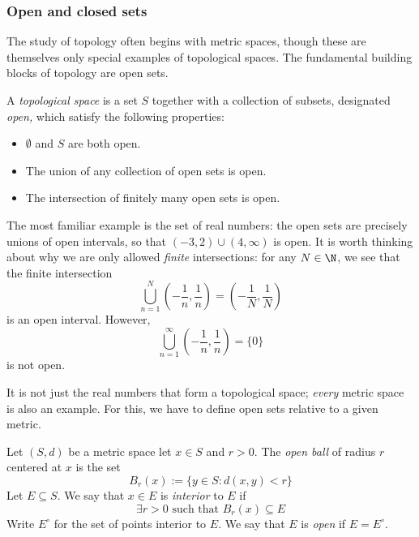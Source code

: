 \subsubsection*{Open and closed sets}

The study of topology often begins with metric spaces, though these are themselves only special examples of topological spaces. The fundamental building blocks of topology are open sets.

\begin{defn}
A \emph{topological space} is a set $S$ together with a collection of subsets, designated \emph{open,} which satisfy the following properties:
\begin{itemize}
  \item $\emptyset$ and $S$ are both open.
  \item The union of any collection of open sets is open.
  \item The intersection of finitely many open sets is open.
\end{itemize}
\end{defn}

The most familiar example is the set of real numbers: the open sets are precisely unions of open intervals, so that $(-3,2)\cup(4,\infty)$ is open. It is worth thinking about why we are only allowed \emph{finite} intersections: for any $N\in\N$, we see that the finite intersection
\[\bigcup_{n=1}^N\left(-\frac 1n,\frac 1n\right)=\left(-\frac 1N,\frac 1N\right)\]
is an open interval. However,
\[\bigcup_{n=1}^\infty\left(-\frac 1n,\frac 1n\right)=\{0\}\]
is not open.\pagebreak[1]

It is not just the real numbers that form a topological space; \emph{every} metric space is also an example. For this, we have to define open sets relative to a given metric.

\begin{defn}
Let $(S,d)$ be a metric space let $x\in S$ and $r>0$. The \emph{open ball} of radius $r$ centered at $x$ is the set
\[B_r(x):=\{y\in S:d(x,y)<r\}\]
Let $E\subseteq S$. We say that $x\in E$ is \emph{interior} to $E$ if
\[\exists r>0\text{ such that }B_r(x)\subseteq E\]
Write $E^\circ$ for the set of points interior to $E$. We say that $E$ is \emph{open} if $E=E^\circ$.
\end{defn}

